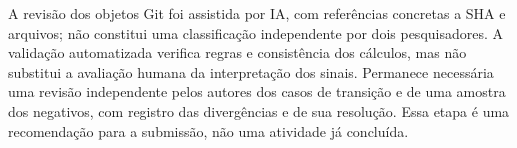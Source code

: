 A revisão dos objetos Git foi assistida por IA, com referências concretas a SHA e arquivos; não constitui uma classificação independente por dois pesquisadores. A validação automatizada verifica regras e consistência dos cálculos, mas não substitui a avaliação humana da interpretação dos sinais. Permanece necessária uma revisão independente pelos autores dos casos de transição e de uma amostra dos negativos, com registro das divergências e de sua resolução. Essa etapa é uma recomendação para a submissão, não uma atividade já concluída.
